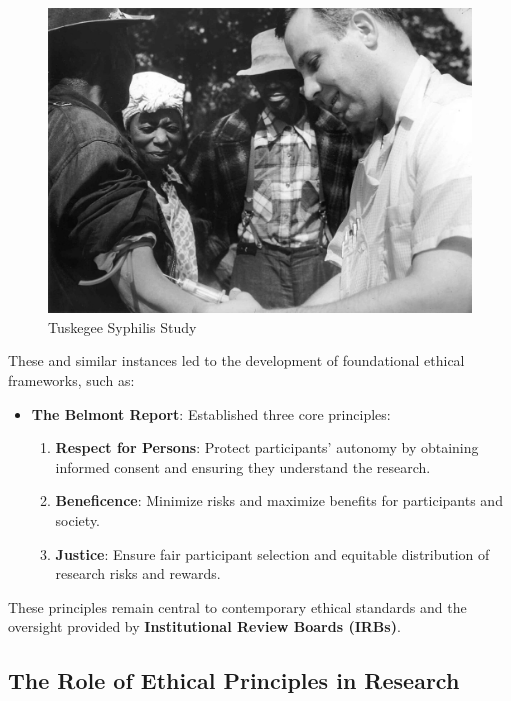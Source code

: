 \documentclass[
]{book}
\providecommand{\tightlist}{%
  \setlength{\itemsep}{0pt}\setlength{\parskip}{0pt}}
\begin{document}
\begin{figure}
\centering
\includegraphics[width=1\linewidth,height=\textheight,keepaspectratio]{images/Tuskegee-syphilis-study.jpg}
\caption{Tuskegee Syphilis Study}
\end{figure}

These and similar instances led to the development of foundational ethical frameworks, such as:

\begin{itemize}
\tightlist
\item
  \textbf{The Belmont Report}: Established three core principles:

  \begin{enumerate}
  \def\labelenumi{\arabic{enumi}.}
  \tightlist
  \item
    \textbf{Respect for Persons}: Protect participants' autonomy by obtaining informed consent and ensuring they understand the research.
  \item
    \textbf{Beneficence}: Minimize risks and maximize benefits for participants and society.
  \item
    \textbf{Justice}: Ensure fair participant selection and equitable distribution of research risks and rewards.
  \end{enumerate}
\end{itemize}

These principles remain central to contemporary ethical standards and the oversight provided by \textbf{Institutional Review Boards (IRBs)}.

\subsection*{The Role of Ethical Principles in Research}\label{the-role-of-ethical-principles-in-research}
\end{document}
